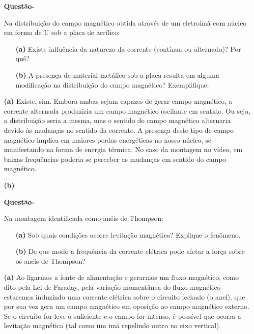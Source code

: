 \documentclass[12pt, a4paper, notitlepage]{article}
\newcounter{counterquestions}
\newenvironment{questions}{
    \noindent
    \stepcounter{counterquestions}
    \textbf{Questão\:\thecounterquestions\:-}
    \noindent
}{
    \noindent
}
\begin{document}
        \begin{questions}
            Na distribuição do campo magnético obtida através de um eletroímã com núcleo em forma de U sob a placa de acrílico:
            \begin{itemize}[noitemsep,topsep=0pt]
                \item[\textbf{(a)}]{Existe influência da natureza da corrente (contínua ou alternada)? Por quê?}
                \item[\textbf{(b)}]{A presença de material metálico sob a placa resulta em alguma modificação na distribuição do campo magnético? Exemplifique.}
            \end{itemize}
        \end{questions}
        
        \textbf{(a)} Existe, sim. Embora ambas sejam capazes de gerar campo magnético, a corrente alternada produziria um campo magnético oscilante em sentido. Ou seja, a distribuição seria a mesma, mas o sentido do campo magnético alternaria devido às mudanças no sentido da corrente. A presença deste tipo de campo magnético implica em maiores perdas energéticas no nosso núcleo, se manifestando na forma de energia térmica. No caso da montagem no vídeo, em baixas frequências poderia se perceber as mudanças em sentido do campo magnético.
        
        \textbf{(b)} 
        
        \begin{questions}
            Na montagem identificada como anéis de Thompson:
            \begin{itemize}[noitemsep,topsep=0pt]
                \item[\textbf{(a)}]{Sob quais condições ocorre levitação magnética? Explique o fenômeno.}
                \item[\textbf{(b)}]{De que modo a frequência da corrente elétrica pode afetar a força sobre os anéis de Thompson?}
            \end{itemize}
        \end{questions}
        
        \textbf{(a)} Ao ligarmos a fonte de alimentação e gerarmos um fluxo magnético, como dito pela Lei de Faraday, pela variação momentânea do fluxo magnético estaremos induzindo uma corrente elétrica sobre o circuito fechado (o anel), que por sua vez gera um campo magnético em oposição ao campo magnético externo. Se o circuito for leve o suficiente e o campo for intenso, é possível que ocorra a levitação magnética (tal como um imã repelindo outro no eixo vertical).
        
\end{document}
